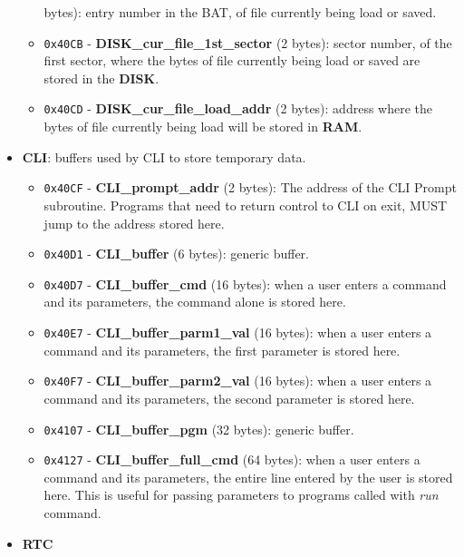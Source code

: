\documentclass[a4paper,11pt]{article}
\begin{document}
\begin{itemize}
\begin{itemize}
            bytes): entry number in the BAT, of file currently being load or
            saved.
            \item \texttt{0x40CB} - \textbf{DISK\_cur\_file\_1st\_sector} (2
            bytes): sector number, of the first sector, where the bytes of file
            currently being load or saved are stored in the \textbf{DISK}.
            \item \texttt{0x40CD} - \textbf{DISK\_cur\_file\_load\_addr} (2
            bytes): address where the bytes of file currently being load will be
            stored in \textbf{RAM}.
        \end{itemize}
        \item \textbf{CLI}: buffers used by CLI to store temporary data.
        \begin{itemize}
            \item \texttt{0x40CF} - \textbf{CLI\_prompt\_addr} (2 bytes): The
            address of the CLI Prompt subroutine. Programs that need to return
            control to CLI on exit, MUST jump to the address stored here.
            \item \texttt{0x40D1} - \textbf{CLI\_buffer} (6 bytes): generic
            buffer.
            \item \texttt{0x40D7} - \textbf{CLI\_buffer\_cmd} (16 bytes): when a
            user enters a command and its parameters, the command alone is
            stored here.
            \item \texttt{0x40E7} - \textbf{CLI\_buffer\_parm1\_val} (16 bytes):
            when a user enters a command and its parameters, the first parameter
            is stored here.
            \item \texttt{0x40F7} - \textbf{CLI\_buffer\_parm2\_val} (16 bytes):
            when a user enters a command and its parameters, the second parameter
            is stored here.
            \item \texttt{0x4107} - \textbf{CLI\_buffer\_pgm} (32 bytes): generic
            buffer.
            \item \texttt{0x4127} - \textbf{CLI\_buffer\_full\_cmd} (64 bytes):
            when a user enters a command and its parameters, the entire line
            entered by the user is stored here. This is useful for passing
            parameters to programs called with \textit{run} command.
        \end{itemize}
        \item \textbf{RTC}
        \begin{itemize}

\end{itemize}
\end{itemize}
\end{document}
